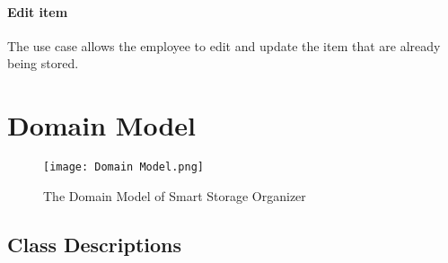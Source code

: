\documentclass[hidelinks, 12pt, a4paper]{article}
\begin{document}
\begin{itemize}
    \paragraph{Edit item}
    The use case allows the employee to edit and update the item that are already being stored.


    \newpage
    \section{Domain Model}

    \begin{figure}[H]
        \centering
        \texttt{[image: Domain Model.png]}
        \caption{The Domain Model of Smart Storage Organizer}
        \label{fig:Smart Storage Organizer ClassDiagram}
    \end{figure}

    \subsection{Class Descriptions}

\end{itemize}
\end{document}

